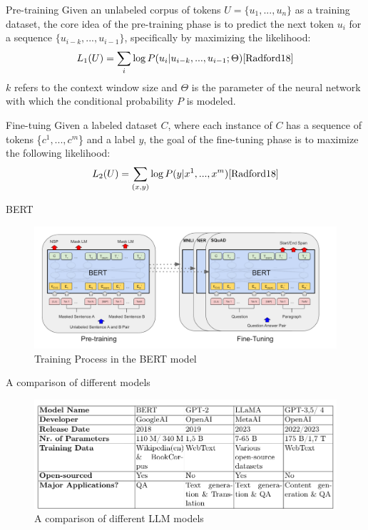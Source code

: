 \documentclass[t]{beamer}
\begin{document}
\begin{frame}{Pre-training}
Given an unlabeled corpus of tokens $U=\{u_1,...,u_n\}$ as a training dataset, the core idea of the pre-training phase is to 
predict the next token $u_i$ for a sequence $\{u_{i-k},...,u_{i-1}\}$, specifically by maximizing the likelihood: 
\begin{equation}
  L_1(U) = \sum_{i}\log{P(u_i|u_{i-k},...,u_{i-1}; \Theta)} \cite{Radford18}
\end{equation}
$k$ refers to the context window size and $\Theta$ is the parameter of the neural network with which the conditional probability $P$ is modeled.
\end{frame}

\begin{frame}{Fine-tuing}
  Given a labeled dataset $C$,
  where each instance of $C$ has a sequence of tokens \{$c^1,...,c^m$\} and a label $y$, the goal of the fine-tuning phase is to maximize the following likelihood:
  \begin{equation}
    L_2(U) = \sum_{(x,y)}\log{P(y|x^1,...,x^m)} \cite{Radford18}
  \end{equation}
\end{frame}

\begin{frame}{BERT}
  \begin{figure}
    \centering
    \includegraphics[width=\textwidth]{BERT Finetuning.png}
    \caption{Training Process in the BERT model \cite{Devlin18}}
    \label{fig:llm2}
\end{figure}
\end{frame}

\begin{frame}{A comparison of different models}
  \begin{figure}
    \centering
    \includegraphics[width=\textwidth]{comparison.png}
    \caption{A comparison of different LLM models}
    \label{fig:llm3}
\end{figure}
\end{frame}
\end{document}
